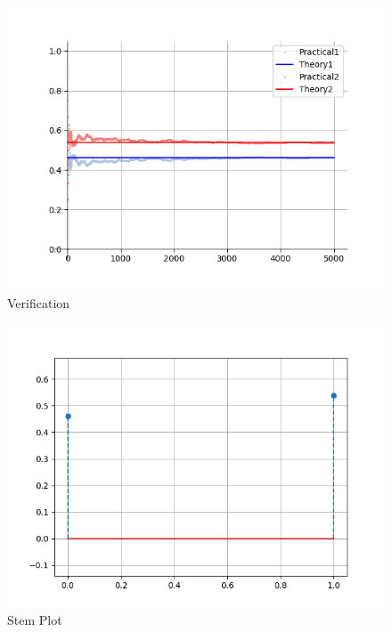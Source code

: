 \documentclass[journal]{IEEEtran}
\begin{document}
    \begin{figure}[H]  
        \centering  
        \includegraphics[width=\columnwidth]{figs/fig1.png}  
        \caption{Verification}
    \end{figure}
    \begin{figure}[H]
        \centering
        \includegraphics[width=\columnwidth]{figs/fig2.png}
        \caption{Stem Plot}
    \end{figure}
\end{document}
